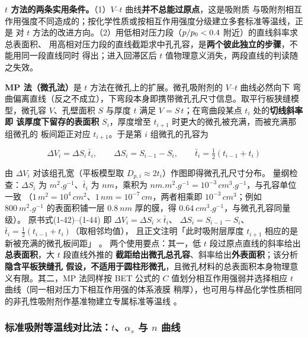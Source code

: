 \begin{keycond}
\textbf{$t$ 方法的两条实用条件。}（1）$V$--$t$ 曲线\textbf{并不总能过原点}，这是吸附质
与吸附剂相互作用强度不同造成的；按化学性质或按相互作用强度分级建立多套标准等温线，正是
对 $t$ 方法的改进方向。（2）用低相对压力段（$p/p_{0}<0.4$ 附近）的直线斜率求总表面积、
用高相对压力段的直线截距求中孔孔容，是\textbf{两个彼此独立的步骤}，不能用同一段直线同时
得出；进入回滞区后 $t$ 值物理意义消失，两段直线的判读随之失效。
\end{keycond}

\textbf{MP 法（微孔法）}是 $t$ 方法在微孔上的扩展。微孔吸附剂的 $V$--$t$ 曲线必然向下
弯曲偏离直线（反之不成立），下弯段本身即携带微孔孔尺寸信息。取平行板狭缝模型，微孔容
$V$、孔壁面积 $S$ 与厚度 $t$ 满足 $V=S\,t$；在弯曲段某点 $t_i$ 处的\textbf{切线斜率即
该厚度下留存的表面积} $S_i$，厚度增至 $t_{i+1}$ 时更大的微孔被充满，而被充满那组微孔的
板间距正对应 $t_{i+1}$。于是第 $i$ 组微孔的孔容为

\begin{equation}\label{eq:mp-dv}
\Delta V_i=\Delta S_i\,\bar{t}_i,\qquad
\Delta S_i=S_{i-1}-S_i,\qquad
\bar{t}_i=\tfrac12\left(t_{i-1}+t_i\right)
\end{equation}

由 $\Delta V_i$ 对该组孔宽（平板模型取 $D_{p,i}\approx2t_i$）作图即得微孔孔尺寸分布。
量纲检查：$\Delta S_i$ 为 $\unit{m^2.g^{-1}}$、$\bar{t}_i$ 为 $\unit{nm}$，乘积为
$\unit{nm.m^2.g^{-1}}=10^{-3}\,\unit{cm^3.g^{-1}}$，与孔容单位一致
（$1\,\unit{m^2}=10^{4}\,\unit{cm^2}$、$1\,\unit{nm}=10^{-7}\,\unit{cm}$，两者相乘即
$10^{-3}\,\unit{cm^3}$；例如 $\qty{800}{m^2.g^{-1}}$ 的表面积铺一层 $\qty{0.8}{nm}$
厚的膜，得 $\qty{0.64}{cm^3.g^{-1}}$，与微孔孔容同量级）。
原书式(1-42)--(1-44) 即 $\Delta V_i=\Delta S_i\times\bar{t}_i$、
$\Delta S_i=S_{i-1}-S_i$、$\bar{t}_i=\frac{1}{2}\left(t_{i-1}+t_i\right)$（取相邻均值），
且正文注明「此时吸附层厚度 $t_{i+1}$ 相应的是新被充满的微孔板间距」
。
两个使用要点：其一，低 $t$ 段过原点直线的斜率给出\textbf{总表面积}，大 $t$ 段直线外推的
\textbf{截距给出微孔总孔容}、斜率给出\textbf{外表面积}；该分析\textbf{隐含平板狭缝孔
假设，不适用于圆柱形微孔}，且微孔材料的总表面积本身物理意义有限。其二，MP 法同样按 BET
公式的 $C$ 值划分相互作用强弱并选择相应 $t$ 曲线（同一相对压力下相互作用强的体系液膜
稍厚），也可用与样品化学性质相同的非孔性吸附剂作基准物建立专属标准等温线
。

\subsubsection{标准吸附等温线对比法：$t$、$\alpha_s$ 与 $n$ 曲线}

